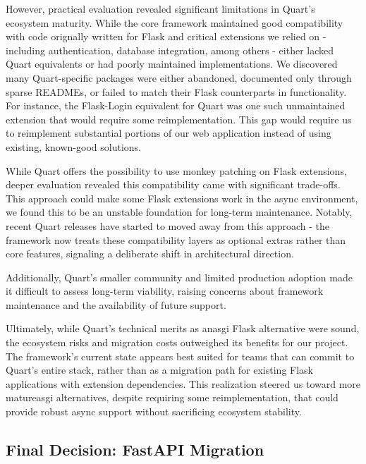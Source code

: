         However, practical evaluation revealed significant limitations in Quart's ecosystem maturity. While the core framework 
        maintained good compatibility with code orignally written for Flask and critical extensions we relied on - including 
        authentication, database integration, among others - either lacked Quart equivalents or had poorly maintained 
        implementations. We discovered many Quart-specific packages were either abandoned, documented only through sparse 
        READMEs, or failed to match their Flask counterparts in functionality. For instance, the Flask-Login equivalent for Quart 
        was one such unmaintained extension that would require some reimplementation. This gap would require us to reimplement 
        substantial portions of our web application instead of using existing, known-good solutions.

        While Quart offers the possibility to use monkey patching on Flask extensions, deeper evaluation revealed this 
        compatibility came with significant trade-offs. This approach could make some Flask extensions work in the 
        async environment, we found this to be an unstable foundation for long-term maintenance. Notably, recent Quart 
        releases have started to moved away from this approach  - the framework now treats these compatibility layers 
        as optional extras rather than core features, signaling a deliberate shift in architectural direction.

        Additionally, Quart's smaller community and limited production adoption made it difficult to assess long-term viability, 
        raising concerns about framework maintenance and the availability of future support.

        Ultimately, while Quart's technical merits as an\ac{asgi} Flask alternative were sound, the ecosystem risks and migration 
        costs outweighed its benefits for our project. The framework's current state appears best suited for teams that 
        can commit to Quart's entire stack, rather than as a migration path for existing Flask applications with extension 
        dependencies. This realization steered us toward more mature\ac{asgi} alternatives, despite requiring some 
        reimplementation, that could provide robust async support without sacrificing ecosystem stability.

    \subsection{Final Decision: FastAPI Migration}

